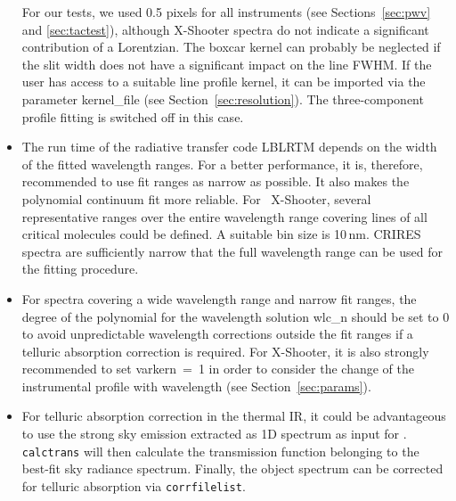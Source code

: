 \begin{itemize}
For our tests, we used 0.5 pixels for all instruments (see
Sections~\ref{sec:pwv} and \ref{sec:tactest}), although X-Shooter spectra do
not indicate a significant contribution of a Lorentzian. The boxcar kernel can
probably be neglected if the slit width does not have a significant impact on
the line FWHM. If the user has access to a suitable line profile kernel, it
can be imported via the parameter {\sc kernel\_file} (see
Section~\ref{sec:resolution}). The three-component profile fitting is switched
off in this case.
\item The run time of the radiative transfer code LBLRTM depends on the
width of the fitted wavelength ranges. For a better performance, it is,
therefore, recommended to use fit ranges as narrow as possible. It also makes
the polynomial continuum fit more reliable. For \eg\ X-Shooter, several
representative ranges over the entire wavelength range covering lines of all
critical molecules could be defined. A suitable bin size is 10\,nm. CRIRES
spectra are sufficiently narrow that the full wavelength range can be used for
the fitting procedure.
\item For spectra covering a wide wavelength range and narrow fit ranges, the
degree of the polynomial for the wavelength solution {\sc wlc\_n} should be set
to 0 to avoid unpredictable wavelength corrections outside the fit ranges if
a telluric absorption correction is required. For X-Shooter, it is also
strongly recommended to set {\sc varkern}~=~1 in order to consider the change
of the instrumental profile with wavelength (see Section~\ref{sec:params}).
\item For telluric absorption correction in the thermal IR, it could be
advantageous to use the strong sky emission extracted as 1D spectrum as input
for \mf. {\tt calctrans} will then calculate the transmission function
belonging to the best-fit sky radiance spectrum. Finally, the object spectrum
can be corrected for telluric absorption via {\tt corrfilelist}.
\end{itemize}

